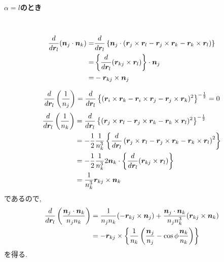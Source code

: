 \paragraph{$\alpha = l$のとき} \
\begin{align}
    \frac{d} {d \bm{r}_{l}} (\bm{n}_{j} \cdot \bm{n}_{k})
 =&
    \frac{d} {d \bm{r}_{l}}
    \left\{
            \bm{n}_{j} \cdot
            (  \bm{r}_{j} \times \bm{r}_{l}
             - \bm{r}_{j} \times \bm{r}_{k}
             - \bm{r}_{k} \times \bm{r}_{l}
             )
    \right\}
 \notag
 \\
 =&
   \left\{
          \frac{d}{d \bm{r}_{l}}
          (\bm{r}_{kj} \times \bm{r}_{l})
   \right\} \cdot \bm{n}_{j}
 \notag
 \\
 =&
   - \bm{r}_{kj} \times \bm{n}_{j}
 \notag
\end{align}

\begin{align}
    \frac{d}{d \bm{r}_{l}} \left(\frac{1}{n_{j}} \right)
 =
    \frac{d}{d \bm{r}_{l}}
    \left\{(  \bm{r}_{i} \times \bm{r}_{k}
            - \bm{r}_{i} \times \bm{r}_{j}
            - \bm{r}_{j} \times \bm{r}_{k} )^{2}
    \right\}^{-\frac{1}{2}}
 =
   0
 \notag
\end{align}
\begin{align}
    \frac{d}{d \bm{r}_{l}} \left(\frac{1}{n_{k}} \right)
 &=
    \frac{d}{d \bm{r}_{l}}
    \left\{(  \bm{r}_{j} \times \bm{r}_{l}
            - \bm{r}_{j} \times \bm{r}_{k}
            - \bm{r}_{k} \times \bm{r}_{l} )^{2}
    \right\}^{-\frac{1}{2}}
 \notag
 \\
 &=
   -\frac{1}{2} \frac{1}{n_{k}^{3}}
    \left\{
           \frac{d}{d \bm{r}_{l}}
           \left(  \bm{r}_{j} \times \bm{r}_{l}
                 - \bm{r}_{j} \times \bm{r}_{k}
                 - \bm{r}_{k} \times \bm{r}_{l}
            \right)^{2}
    \right\}
 \notag
 \\
 &=
   - \frac{1}{2} \frac{1}{n_{k}^{3}}
    2\bm{n}_{k} \cdot
    \left\{
           \frac{d}{d \bm{r}_{l}} (\bm{r}_{kj} \times \bm{r}_{l})
    \right\}
 \notag
 \\
 &=
   \frac{1}{n_{k}^{3}} \bm{r}_{kj} \times \bm{n}_{k}
\notag
\end{align}
であるので, 
\begin{align}
     \frac{d}{d \bm{r}_{l}}
     \left( \frac{\bm{n}_{j} \cdot \bm{n}_{k}} {n_{j} n_{k}} \right)
 &=
     \frac{1}{n_{j}n_{k}}
      (- \bm{r}_{kj} \times \bm{n}_{j})
   + \frac{\bm{n}_{j} \cdot \bm{n}_{k}}{n_{j}n_{k}^{3}}
      (\bm{r}_{kj} \times \bm{n}_{k})
 \notag
 \\
 &=
   - \bm{r}_{kj} \times
     \left\{
            \frac{1}{n_{k}}
            \left(
                   \frac{\bm{n}_{j}}{n_{j}} - \cos\phi \frac{\bm{n}_{k}}{n_{k}}
            \right)
     \right\}
 \notag
\end{align}
を得る.
\\

